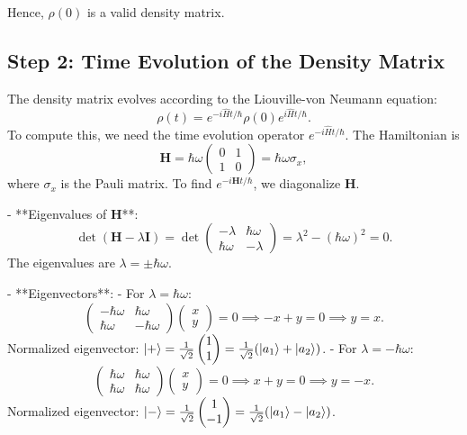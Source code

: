 \documentclass[a4paper,12pt]{article}
\begin{document}
Hence, \(\rho(0)\) is a valid density matrix.

\subsection*{Step 2: Time Evolution of the Density Matrix}

The density matrix evolves according to the Liouville-von Neumann equation:
\[
\rho(t) = e^{-i \hat{H} t / \hbar} \rho(0) e^{i \hat{H} t / \hbar}.
\]
To compute this, we need the time evolution operator \(e^{-i \hat{H} t / \hbar}\). The Hamiltonian is
\[
\boldsymbol{H} = \hbar \omega \begin{pmatrix} 0 & 1 \\ 1 & 0 \end{pmatrix} = \hbar \omega \sigma_x,
\]
where \(\sigma_x\) is the Pauli matrix. To find \(e^{-i \boldsymbol{H} t / \hbar}\), we diagonalize \(\boldsymbol{H}\).

- **Eigenvalues of \(\boldsymbol{H}\)**:
\[
\det(\boldsymbol{H} - \lambda \boldsymbol{I}) = \det \begin{pmatrix} -\lambda & \hbar \omega \\ \hbar \omega & -\lambda \end{pmatrix} = \lambda^2 - (\hbar \omega)^2 = 0.
\]
The eigenvalues are \(\lambda = \pm \hbar \omega\).

- **Eigenvectors**:
  - For \(\lambda = \hbar \omega\):
  \[
  \begin{pmatrix} -\hbar \omega & \hbar \omega \\ \hbar \omega & -\hbar \omega \end{pmatrix} \begin{pmatrix} x \\ y \end{pmatrix} = 0 \implies -x + y = 0 \implies y = x.
  \]
  Normalized eigenvector: \(\ket{+} = \frac{1}{\sqrt{2}} \begin{pmatrix} 1 \\ 1 \end{pmatrix} = \frac{1}{\sqrt{2}} (\ket{a_1} + \ket{a_2})\).
  - For \(\lambda = -\hbar \omega\):
  \[
  \begin{pmatrix} \hbar \omega & \hbar \omega \\ \hbar \omega & \hbar \omega \end{pmatrix} \begin{pmatrix} x \\ y \end{pmatrix} = 0 \implies x + y = 0 \implies y = -x.
  \]
  Normalized eigenvector: \(\ket{-} = \frac{1}{\sqrt{2}} \begin{pmatrix} 1 \\ -1 \end{pmatrix} = \frac{1}{\sqrt{2}} (\ket{a_1} - \ket{a_2})\).
\end{document}
